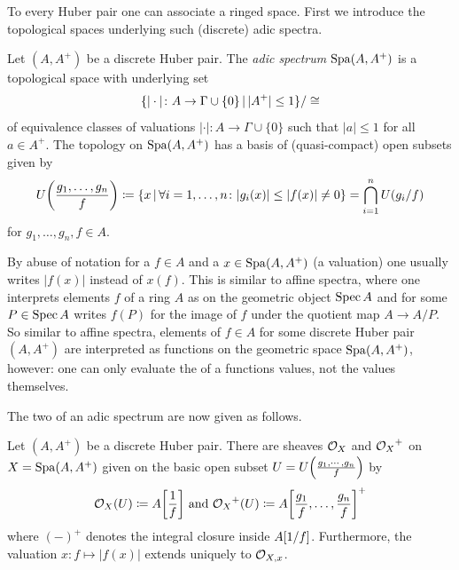 To every Huber pair one can associate a  ringed space. First we introduce the topological spaces underlying such (discrete) adic spectra.
\begin{definition}
	Let $(A, A^+)$ be a discrete Huber pair. The \emph{adic spectrum} $\operatorname{Spa}(A, A^+)$ is a topological space with underlying set
		$$\{\vert\cdot\vert\colon A\to \Gamma\cup \{0\} \,\vert\, \vert A^+\vert \le 1\} / \cong$$
	of equivalence classes of valuations $\vert\cdot\vert\colon A\to \Gamma\cup \{0\}$ such that $\vert a\vert \le 1$ for all $a\in A^+$. The topology on $\operatorname{Spa}(A, A^+)$ has a basis of (quasi-compact) open subsets given by
		$$U\mleft(\frac{g_1,\dots, g_n}{f}\mright)\ldef \{x\setseparator \forall i = 1,\dots, n\colon \vert g_i(x)\vert \le \vert f(x)\vert \ne 0\} = \bigcap_{i=1}^n U\mleft({g_i}/{f}\mright)$$
	for $g_1,\dots, g_n, f\in A$.
\end{definition}

\begin{remark}
	By abuse of notation for a  $f\in A$ and a  $x\in \operatorname{Spa}(A, A^+)$ (a valuation) one usually writes $\vert f(x)\vert$ instead of $x(f)$. This is similar to affine spectra, where one interprets elements $f$ of a ring $A$ as  on the geometric object $\operatorname{Spec} A$ and for some  $P\in \operatorname{Spec} A$ writes $f(P)$ for the image of $f$ under the quotient map $A\to A/P$. So similar to affine spectra, elements of $f\in A$ for some discrete Huber pair $(A, A^+)$ are interpreted as functions on the geometric space $\operatorname{Spa}(A, A^+)$, however: one can only evaluate the  of a functions values, not the values themselves.
\end{remark}

The two  of an adic spectrum are now given as follows.
\begin{proposition}
	Let $(A, A^+)$ be a discrete Huber pair. There are sheaves ${{\mathcal{O}}_{X}}$ and ${{\mathcal{O}}_{X}}^+$ on $X=\operatorname{Spa}(A, A^+)$ given on the basic open subset $U = U\mleft(\frac{g_1,\cdots, g_n}{f}\mright)$ by
		$$\struct{X}(U)\ldef A\mleft[\frac{1}{f}\mright]\text{ and }\struct{X}^+(U)\ldef A\mleft[\frac{g_1}{f},\dots, \frac{g_n}{f}\mright]^+$$
	where $(-)^+$ denotes the integral closure inside $A\mleft[1/f\mright]$. Furthermore, the valuation $x\colon f\mapsto \vert f(x)\vert$ extends uniquely to ${\mathcal{O}}_{X, x}$.
\end{proposition}

